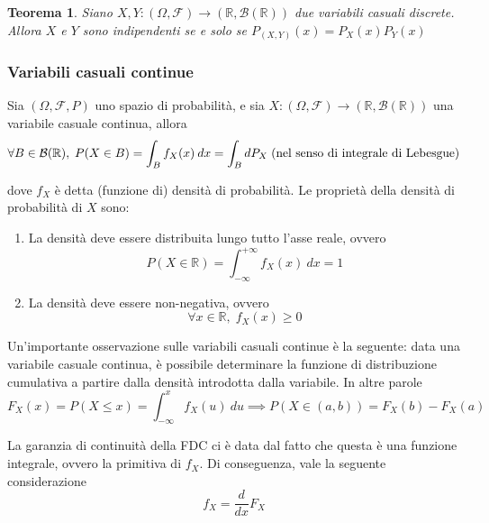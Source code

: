 \documentclass{article}
\newtheorem{theorem}{Teorema}
\begin{document}
                \vspace{10pt}
                \begin{theorem}
                    Siano $X, Y: (\Omega, \mathcal{F}) \rightarrow (\mathbb{R}, \mathcal{B}(\mathbb{R}))$ due variabili casuali discrete.
                    Allora $X$ e $Y$ sono indipendenti se e solo se $P_{(X, Y)}(x) = P_{X}(x)P_{Y}(x)$
                \end{theorem}

            \subsubsection{Variabili casuali continue}
                Sia $(\Omega, \mathcal{F}, P)$ uno spazio di probabilità, e sia $X: (\Omega, \mathcal{F}) \rightarrow (\mathbb{R}, \mathcal{B}(\mathbb{R}))$ una variabile casuale continua, allora
                \[
                    \forall B \in \mathcal{B}(\mathbb{R}), \; P(X \in B) = \int_{B} f_{X}(x) \: dx = \int_{B} d{P}_{X} \; \textnormal{(nel senso di integrale di Lebesgue)}
                \]

                dove $f_{X}$ è detta (funzione di) densità di probabilità.
                Le proprietà della densità di probabilità di $X$ sono:

                \begin{enumerate}
                    \item La densità deve essere distribuita lungo tutto l'asse reale, ovvero
                    \[
                        P(X \in \mathbb{R}) = \int_{-\infty}^{+\infty} f_{X}(x) \: dx = 1
                    \]

                    \item La densità deve essere non-negativa, ovvero
                    \[
                        \forall x \in \mathbb{R}, \; f_{X}(x) \geq 0
                    \]
                \end{enumerate}

                Un'importante osservazione sulle variabili casuali continue è la seguente: data una variabile casuale continua, è possibile determinare la funzione di distribuzione cumulativa a partire dalla densità introdotta dalla variabile.
                In altre parole
                \[
                    F_{X}(x) = P(X \leq x) = \int_{-\infty}^{x} f_{X}(u) \: du \implies P(X \in (a, b)) = F_{X}(b) - F_{X}(a)
                \]

                La garanzia di continuità della FDC ci è data dal fatto che questa è una funzione integrale, ovvero la primitiva di $f_{X}$.
                Di conseguenza, vale la seguente considerazione
                \[
                    f_{X} = \frac{d}{dx} F_{X}
                \]
\end{document}
